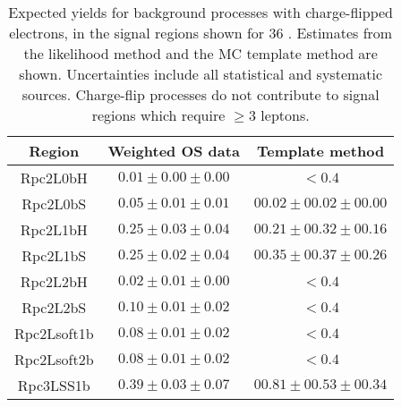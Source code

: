 \begin{table}[!htb]
\centering
\begin{tabular}{|c||c|c|}\hline
 Region      &   Weighted OS data          &     Template method \\\hline
    Rpc2L0bH & $ 0.01 \pm  0.00 \pm  0.00$ & $<0.4$ \\
    Rpc2L0bS & $ 0.05 \pm  0.01 \pm  0.01$ & $ 00.02 \pm 00.02 \pm 00.00 $ \\
    Rpc2L1bH & $ 0.25 \pm  0.03 \pm  0.04$ & $ 00.21 \pm 00.32 \pm 00.16 $ \\
    Rpc2L1bS & $ 0.25 \pm  0.02 \pm  0.04$ & $ 00.35 \pm 00.37 \pm 00.26 $ \\
    Rpc2L2bH & $ 0.02 \pm  0.01 \pm  0.00$ & $<0.4$ \\
    Rpc2L2bS & $ 0.10 \pm  0.01 \pm  0.02$ & $<0.4$ \\
 Rpc2Lsoft1b & $ 0.08 \pm  0.01 \pm  0.02$ & $<0.4$ \\
 Rpc2Lsoft2b & $ 0.08 \pm  0.01 \pm  0.02$ & $<0.4$ \\
   Rpc3LSS1b & $ 0.39 \pm  0.03 \pm  0.07$ & $ 00.81 \pm 00.53 \pm 00.34 $ \\
\hline
\hline
\end{tabular}
\caption{Expected yields for background processes with charge-flipped electrons,
in the signal regions shown for 36 \ifb. 
Estimates from the likelihood method and the MC template method are shown.
Uncertainties include all statistical and systematic sources. 
Charge-flip processes do not contribute to signal regions which require $\ge 3$ leptons. 
}
\label{tab:chflips_sr_yields}
\end{table}


\begin{table}[!htb]
\def\arraystretch{1.1}
\centering
{}
\caption{Comparison of expected yields for background processes with fake leptons,
in the validation regions, shown for 36 \ifb~between the data driven (DD) estimates and the MC template method (MC) estimates. 
}
\label{tab:VR_Comparison}
\end{table}
